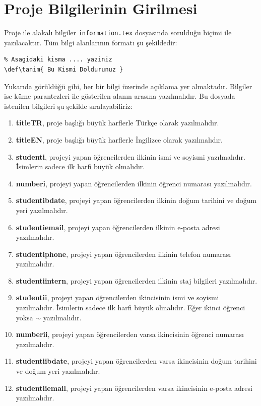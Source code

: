 \section{Proje Bilgilerinin Girilmesi}
Proje ile alakalı bilgiler \texttt{information.tex} dosyasında sorulduğu biçimi ile yazılacaktır. Tüm bilgi alanlarının formatı şu şekildedir:

\begin{verbatim}
% Asagidaki kisma .... yaziniz
\def\tanim{ Bu Kismi Doldurunuz }
\end{verbatim}

Yukarıda görüldüğü gibi, her bir bilgi üzerinde açıklama yer almaktadır. Bilgiler ise küme parantezleri ile gösterilen alanın arasına yazılmalıdır. Bu dosyada istenilen bilgileri şu şekilde sıralayabiliriz:

\begin{enumerate}
    \item \textbf{titleTR}, proje başlığı büyük harflerle Türkçe olarak yazılmalıdır.
    \item \textbf{titleEN}, proje başlığı büyük harflerle İngilizce olarak yazılmalıdır.
    \item \textbf{studenti}, projeyi yapan öğrencilerden ilkinin ismi ve soyismi yazılmalıdır. İsimlerin sadece ilk harfi büyük olmalıdır.
    \item \textbf{numberi}, projeyi yapan öğrencilerden ilkinin öğrenci numarası yazılmalıdır.
    \item \textbf{studentibdate}, projeyi yapan öğrencilerden ilkinin doğum tarihini ve doğum yeri yazılmalıdır.
    \item \textbf{studentiemail}, projeyi yapan öğrencilerden ilkinin e-posta adresi yazılmalıdır.
    \item \textbf{studentiphone}, projeyi yapan öğrencilerden ilkinin telefon numarası yazılmalıdır.
    \item \textbf{studentiintern}, projeyi yapan öğrencilerden ilkinin staj bilgileri yazılmalıdır.
    \item \textbf{studentii}, projeyi yapan öğrencilerden ikincisinin ismi ve soyismi yazılmalıdır. İsimlerin sadece ilk harfi büyük olmalıdır. Eğer ikinci öğrenci yoksa $\sim$ yazılmalıdır.
    \item \textbf{numberii}, projeyi yapan öğrencilerden varsa ikincisinin öğrenci numarası yazılmalıdır.
    \item \textbf{studentiibdate}, projeyi yapan öğrencilerden varsa ikincisinin doğum tarihini ve doğum yeri yazılmalıdır.
    \item \textbf{studentiiemail}, projeyi yapan öğrencilerden varsa ikincisinin e-posta adresi yazılmalıdır.

\end{enumerate}
